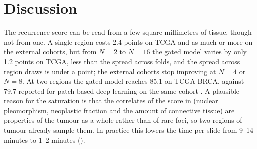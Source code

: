 \documentclass{midl} %
\begin{document}

\section{Discussion}
\label{sec:discussion}

The recurrence score can be read from a few square millimetres of tissue, though not from one.
A single region costs 2.4 points on TCGA and as much or more on the external cohorts, but from
$N=2$ to $N=16$ the gated model varies by only 1.2 points on TCGA, less than the spread across
folds, and the spread across region draws is under a point; the external cohorts stop
improving at $N=4$ or $N=8$. At two regions the gated model reaches 85.1 on TCGA-BRCA, against 79.7 reported for
patch-based deep learning on the same cohort \citep{howard2024}. A plausible reason for the
saturation is that the correlates of the score in  (nuclear pleomorphism,
neoplastic fraction and the amount of connective tissue) are properties of the tumour as a
whole rather than of rare foci, so two regions of tumour already sample them. In practice this
lowers the time per slide from 9--14 minutes to 1--2 minutes ().
\end{document}

